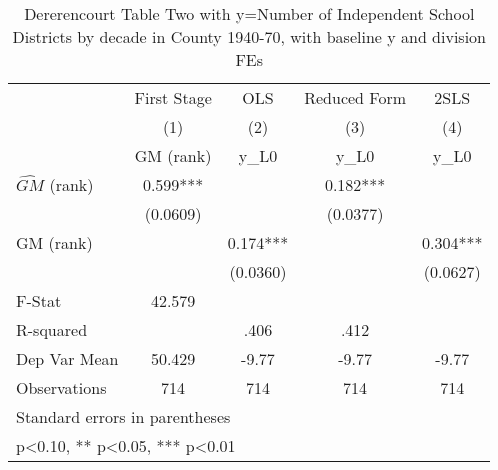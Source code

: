 \begin{table}[htbp]\centering
\def\sym#1{\ifmmode^{#1}\else\(^{#1}\)\fi}
\caption{Dererencourt Table Two with y=Number of Independent School Districts by decade in County 1940-70, with baseline y and division FEs}
\begin{tabular}{l*{4}{c}}
\toprule
                    & First Stage   &         OLS   &Reduced Form   &        2SLS   \\
                    &\multicolumn{1}{c}{(1)}&\multicolumn{1}{c}{(2)}&\multicolumn{1}{c}{(3)}&\multicolumn{1}{c}{(4)}\\
                    &\multicolumn{1}{c}{GM  (rank)}&\multicolumn{1}{c}{y\_L0}&\multicolumn{1}{c}{y\_L0}&\multicolumn{1}{c}{y\_L0}\\
\midrule
$\hat{GM}$ (rank)   &       0.599***&               &       0.182***&               \\
                    &    (0.0609)   &               &    (0.0377)   &               \\
\addlinespace
GM  (rank)          &               &       0.174***&               &       0.304***\\
                    &               &    (0.0360)   &               &    (0.0627)   \\
\midrule
F-Stat              &      42.579   &               &               &               \\
R-squared           &               &        .406   &        .412   &               \\
Dep Var Mean        &      50.429   &       -9.77   &       -9.77   &       -9.77   \\
Observations        &         714   &         714   &         714   &         714   \\
\bottomrule
\multicolumn{5}{l}{\footnotesize Standard errors in parentheses}\\
\multicolumn{5}{l}{\footnotesize * p<0.10, ** p<0.05, *** p<0.01}\\
\end{tabular}
\end{table}
